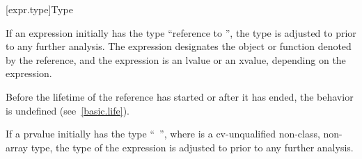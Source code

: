 [expr.type]{Type}

\pnum
{}%
If an expression initially has the type ``reference to
'', the type is adjusted to
 prior to any further analysis. The expression designates the
object or function denoted by the reference, and the expression
is an lvalue or an xvalue, depending on the expression.
\begin{note}
Before the lifetime of the reference has started or after it has ended,
the behavior is undefined (see~\ref{basic.life}).
\end{note}

\pnum
If a prvalue initially has the type ``\cv{}~'', where
 is a cv-unqualified non-class, non-array type, the type of
the expression is adjusted to  prior to any further analysis.

